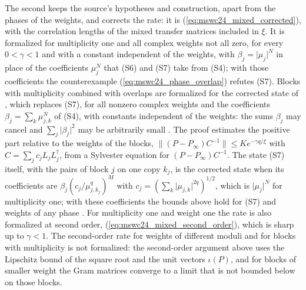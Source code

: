 \documentclass{article}
\begin{document}
The second keeps the source's hypotheses and construction, apart from the phases of the
weights, and corrects the rate: it
is (\ref{eq:mswc24_mixed_corrected}), with the correlation lengths of the mixed
transfer matrices included in $\xi$. It is formalized for multiplicity one and all complex
weights not all zero, for every $0<\gamma<1$ and with a constant independent of the weights, with
$\beta_j=\lvert\mu_j\rvert^N$ in place of the coefficients $\mu_j^N$ that (S6) and (S7) take
from (S4); with those coefficients the counterexample (\ref{eq:mswc24_phase_overlap}) refutes
(S7). Blocks with multiplicity combined with overlaps are formalized for the corrected state of
\cite{gap:mswc24_repeated_block_corrected_state}, which replaces (S7), for all nonzero complex
weights and the coefficients $\beta_j=\sum_k\mu_{j,k}^N$ of (S4), with constants independent of the
weights: the sums $\beta_j$ may cancel and $\sum_j\lvert\beta_j\rvert^2$ may be arbitrarily small
\cite{gap:mswc24_repeated_overlap_small_weight_sum}. The proof estimates the positive part relative
to the weights of the blocks, $\lVert(P-P_\infty)C^{-1}\rVert\leq Ke^{-\gamma q/\xi}$ with
$C=\sum_jc_jL_jL_j^\dagger$, from a Sylvester equation for $(P-P_\infty)C^{-1}$. The state (S7)
itself, with the pairs of block $j$ on one copy $k_j$, is the corrected state when its coefficients
are $\beta_j(c_j/\mu_{j,k_j}^q)^M$ with $c_j=(\sum_k\lvert\mu_{j,k}\rvert^{2q})^{1/2}$, which is
$\lvert\mu_j\rvert^N$ for multiplicity one; with these coefficients the bounds above hold for
(S7) and weights of any phase \cite{gap:mswc24_repeated_block_corrected_state}. For multiplicity
one and weight one the rate is also formalized at second order,
(\ref{eq:mswc24_mixed_second_order}), which is sharp up to $\gamma<1$. The second-order rate for
weights of different moduli and for blocks with multiplicity is not formalized: the second-order
argument above uses the Lipschitz bound of the square root and the unit vectors $\iota(P)$, and
for blocks of smaller weight the Gram matrices converge to a limit that is not bounded below on
those blocks.



\end{document}
